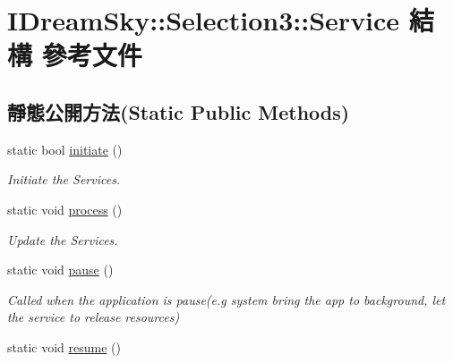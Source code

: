 \hypertarget{struct_i_dream_sky_1_1_selection3_1_1_service}{}\section{I\+Dream\+Sky\+:\+:Selection3\+:\+:Service 結構 參考文件}
\label{struct_i_dream_sky_1_1_selection3_1_1_service}
\subsection*{靜態公開方法(Static Public Methods)}
\begin{DoxyCompactItemize}
\item 
static bool \hyperlink{struct_i_dream_sky_1_1_selection3_1_1_service_af97577d357a0dd71955f6e716b5b20a8}{initiate} ()
\begin{DoxyCompactList}\small\item\em Initiate the Services. \end{DoxyCompactList}\item 
static void \hyperlink{struct_i_dream_sky_1_1_selection3_1_1_service_a7f103ac6e4b241a1322a9ab90fe5c332}{process} ()\hypertarget{struct_i_dream_sky_1_1_selection3_1_1_service_a7f103ac6e4b241a1322a9ab90fe5c332}{}\label{struct_i_dream_sky_1_1_selection3_1_1_service_a7f103ac6e4b241a1322a9ab90fe5c332}

\begin{DoxyCompactList}\small\item\em Update the Services. \end{DoxyCompactList}\item 
static void \hyperlink{struct_i_dream_sky_1_1_selection3_1_1_service_abf6385a929f1e0a4906e3500fa0f2880}{pause} ()\hypertarget{struct_i_dream_sky_1_1_selection3_1_1_service_abf6385a929f1e0a4906e3500fa0f2880}{}\label{struct_i_dream_sky_1_1_selection3_1_1_service_abf6385a929f1e0a4906e3500fa0f2880}

\begin{DoxyCompactList}\small\item\em Called when the application is pause(e.\+g system bring the app to background, let the service to release resources) \end{DoxyCompactList}\item 
static void \hyperlink{struct_i_dream_sky_1_1_selection3_1_1_service_a7fb1c906d4f97ac9b7ae35ca7856b601}{resume} ()\hypertarget{struct_i_dream_sky_1_1_selection3_1_1_service_a7fb1c906d4f97ac9b7ae35ca7856b601}{}\label{struct_i_dream_sky_1_1_selection3_1_1_service_a7fb1c906d4f97ac9b7ae35ca7856b601}


\end{DoxyCompactItemize}
